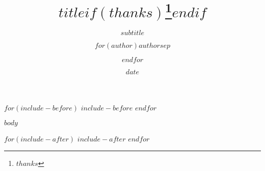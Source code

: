 \documentclass[11pt,letterpaper]{report}
\title{$title$$if(thanks)$\thanks{$thanks$}$endif$}
\subtitle{$subtitle$}
\author{$for(author)$$author$$sep$ \and $endfor$}
\date{$date$}
\begin{document}
$for(include-before)$
$include-before$
$endfor$

$body$

$for(include-after)$
$include-after$
$endfor$
\end{document}
